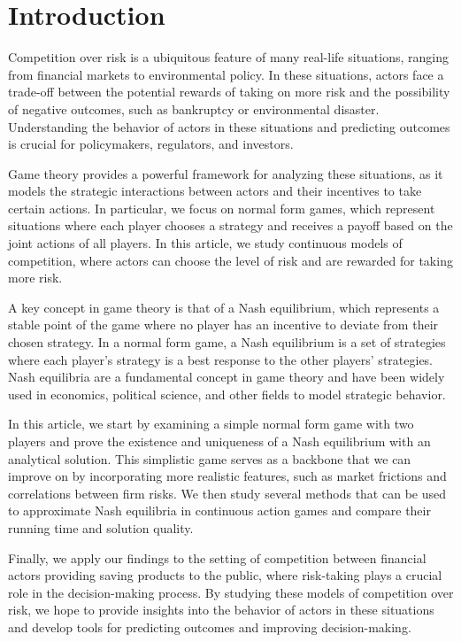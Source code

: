 \documentclass[preprint,12pt,authoryear,doubleblind]{elsarticle}
\theoremstyle{definition}
\begin{document}
\section{Introduction}
\label{sec:introduction}

Competition over risk is a ubiquitous feature of many real-life situations, ranging from financial markets to environmental policy. In these situations, actors face a trade-off between the potential rewards of taking on more risk and the possibility of negative outcomes, such as bankruptcy or environmental disaster. Understanding the behavior of actors in these situations and predicting outcomes is crucial for policymakers, regulators, and investors.

Game theory provides a powerful framework for analyzing these situations, as it models the strategic interactions between actors and their incentives to take certain actions. In particular, we focus on normal form games, which represent situations where each player chooses a strategy and receives a payoff based on the joint actions of all players. In this article, we study continuous models of competition, where actors can choose the level of risk and are rewarded for taking more risk.

A key concept in game theory is that of a Nash equilibrium, which represents a stable point of the game where no player has an incentive to deviate from their chosen strategy. In a normal form game, a Nash equilibrium is a set of strategies where each player's strategy is a best response to the other players' strategies. Nash equilibria are a fundamental concept in game theory and have been widely used in economics, political science, and other fields to model strategic behavior.

In this article, we start by examining a simple normal form game with two players and prove the existence and uniqueness of a Nash equilibrium with an analytical solution. This simplistic game serves as a backbone that we can improve on by incorporating more realistic features, such as market frictions and correlations between firm risks. We then study several methods that can be used to approximate Nash equilibria in continuous action games and compare their running time and solution quality.

Finally, we apply our findings to the setting of competition between financial actors providing saving products to the public, where risk-taking plays a crucial role in the decision-making process. By studying these models of competition over risk, we hope to provide insights into the behavior of actors in these situations and develop tools for predicting outcomes and improving decision-making.
\end{document}

